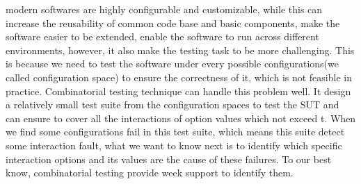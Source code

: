 \documentclass[10pt,journal,cspaper,compsoc]{IEEEtran}
\begin{document}
%
%
%
%
 modern softwares are highly configurable and customizable, while this can increase the reusability of  common code base and basic components, make the software easier to be extended, enable the software to run across different environments, however, it also make the testing task to be more challenging. This is because we need to test the software under every possible configurations(we called configuration space) to ensure the correctness of it, which is not feasible in practice. Combinatorial testing technique can handle this problem well. It design a relatively small test suite from the configuration spaces to test the SUT and can ensure to cover all the interactions of option values which not exceed t. When we find some configurations fail in this test suite, which means this suite detect some interaction fault, what we want to know next is to identify which specific interaction options and its values are the cause of these failures. To our best know, combinatorial testing provide week support to identify them.
\end{document}
